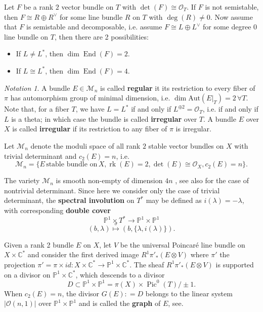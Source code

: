 \documentclass[
  a4paper, 
  reqno, 
  oneside, 
  11pt
]{amsart}
\theoremstyle{plain}	%
\theoremstyle{mydef} %
\theoremstyle{remark}
\newtheorem{notation}{Notation}
\theoremstyle{definition}
\theoremstyle{remark}
\DeclareMathOperator{\Pic}{Pic}
\DeclareMathOperator{\End}{End}
\DeclareMathOperator{\rk}{rk}
\newcommand{\ce}{\mathrel{\mathop:}=}
\begin{document}
Let $F$ be a rank $2$ vector bundle on $T$
with $\det(F)\cong \mathcal O_T$. If $F$ is not semistable, then $F\cong R\oplus R^\vee$ for some line bundle $R$ on $T$ with $\deg(R) \ne 0$.
Now assume that $F$ is semistable and decomposable, i.e. assume $F\cong L\oplus L^\vee$ for some degree $0$ line bundle on $T$, then there are 2 possibilities:
\begin{itemize}
\item If $L\ne L^\ast$, then $\dim \End(F) =2$. 
\item If $L\cong L^\ast$, then $\dim \End(F)=4$.
\end{itemize}

\begin{notation}\label{irregdef} 
A  bundle $E\in \mathcal M_n$  is called {\bf regular} it its restriction to every fiber of $\pi$ has 
automorphism group of minimal dimension, i.e. $\dim \mbox{Aut}(E\vert_{T}) =  2\, \forall T$.
Note that, for a fiber $T$, we have $L=L^\ast$ if and only if $L^{\oplus 2}= \mathcal O_T$, i.e. if and only if $L$ is a theta;
 in which case the bundle is called {\bf irregular} over $T$. 
 A bundle $E$ over $X$ is called {\bf irregular} if its restriction to any fiber of $\pi$ is irregular. \\
\end{notation}



Let $\mathcal M_n$ denote the moduli space
of all rank $2$ stable vector bundles on $X$ with trivial determinant and $c_2(E)=n$, i.e.
$$\mathcal M_n=\{E\,  \text{stable  bundle on} \, X,   \rk(E)=2, \det(E)\cong \mathcal O_X, c_2(E)=n\}.$$




The variety $\mathcal M_n$ is  smooth non-empty    of dimension 
$4n$ \cite[Prop..4]{BH}, see also 
\cite[Prop.]{BMo} for the case of nontrivial determinant.
Since here we consider only the case of trivial determinant,  the 
{\bf spectral involution} on $T^*$ may be defined 
as $i(\lambda) = -\lambda$, with corresponding {\bf double cover} 
\begin{equation}\label{dc}\mathbb P^1 \times T^* \to \mathbb P^1 \times \mathbb P^1\end{equation} 
$$(b, \lambda) \stackrel{\sigma}{\mapsto} (b, \{\lambda, i(\lambda)\}).$$


Given a rank 2 bundle $E$ on $X$, let $V$ be the universal Poincaré line bundle on
$X \times \mathbb C^*$ and consider the first derived image $R^1\pi'_*(E \otimes V)$ where
$\pi'$  the projection $\pi'= \pi\times id \colon X\times \mathbb C^* \to \mathbb P^1 \times \mathbb C^*$. 
The sheaf $R^1\pi'_*(E \otimes V)$ is supported on a divisor on $ \mathbb P^1\times \mathbb C^*$, 
which descends to a divisor 
$$D \subset \mathbb P^1\times \mathbb P^1 = \pi(X) \times \Pic^0(T)/\pm1.$$ When $c_2(E)=n$, the divisor
 $G(E) \ce D $ belongs to the linear system $|\mathcal O(n,1)|$ over $\mathbb P^1\times \mathbb P^1$
 and is called the {\bf graph} of $E$, see\cite[Prop..3]{BH}. \\
\end{document}

